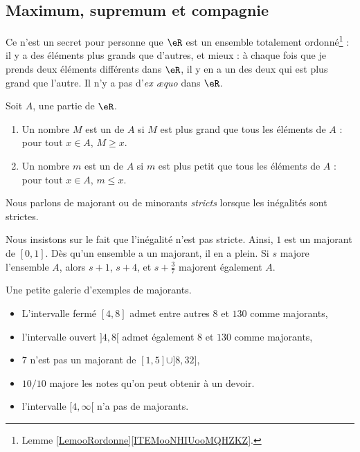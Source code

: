 \subsection{Maximum, supremum et compagnie}

Ce n'est un secret pour personne que $\eR$ est un ensemble totalement ordonné\footnote{Lemme \ref{LemooRordonne}\ref{ITEMooNHIUooMQHZKZ}.} : il y a des éléments plus grands que d'autres, et mieux : à chaque fois que je prends deux éléments différents dans $\eR$, il y en a un des deux qui est plus grand que l'autre. Il n'y a pas d'\emph{ex æquo} dans $\eR$.

\begin{definition}
    Soit \( A\), une partie de \( \eR\). 
    \begin{enumerate}
        \item
            Un nombre \( M\) est un  de \( A\) si \( M\) est plus grand que tous les éléments de \( A\) : pour tout \( x\in A\), \( M\geq x\).
        \item
            Un nombre \( m\) est un  de \( A\) si \( m\) est plus petit que tous les éléments de \( A\) : pour tout \( x\in A\), \( m\leq x\).
    \end{enumerate}
    Nous parlons de majorant ou de minorants \emph{stricts} lorsque les inégalités sont strictes.
\end{definition}

Nous insistons sur le fait que l'inégalité n'est pas stricte. Ainsi, $1$ est un majorant de $[0,1]$. Dès qu'un ensemble a un majorant, il en a plein. Si $s$ majore l'ensemble $A$, alors $s+1$, $s+4$, et \( s+\frac{ 3 }{ 7 }\) majorent également $A$.

\begin{example}
Une petite galerie d'exemples de majorants.
\begin{itemize}
\item L'intervalle fermé $[4,8]$ admet entre autres $8$ et $130$ comme majorants,
\item l'intervalle ouvert $]4,8[$ admet également $8$ et $130$ comme majorants,
\item $7$ n'est pas un majorant de $[1,5]\cup]8,32]$,
\item $10/10$ majore les notes qu'on peut obtenir à un devoir.
\item l'intervalle $[4,\infty[$ n'a pas de majorants.
\end{itemize}
\end{example}

